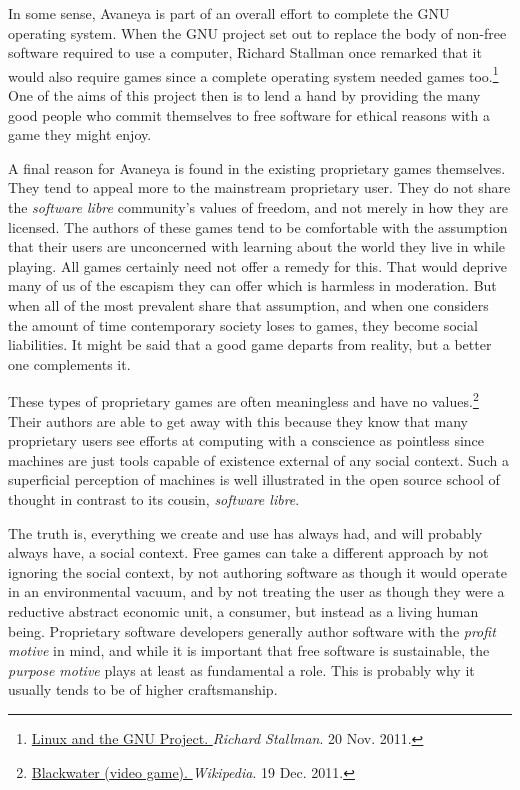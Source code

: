 In some sense, Avaneya is part of an overall effort to complete the GNU operating system. When the GNU project set out to replace the body of non-free software required to use a computer, Richard Stallman once remarked that it would also require games since a complete operating system needed games too.\footnote{\href{http://www.gnu.org/gnu/linux-and-gnu.html}{Linux and the GNU Project. }{\it Richard Stallman}. 20 Nov. 2011.} One of the aims of this project then is to lend a hand by providing the many good people who commit themselves to free software for ethical reasons with a game they might enjoy.

A final reason for Avaneya is found in the existing proprietary games themselves. They tend to appeal more to the mainstream proprietary user. They do not share the {\it software libre} community's values of freedom, and not merely in how they are licensed. The authors of these games tend to be comfortable with the assumption that their users are unconcerned with learning about the world they live in while playing. All games certainly need not offer a remedy for this. That would deprive many of us of the escapism they can offer which is harmless in moderation. But when all of the most prevalent share that assumption, and when one considers the amount of time contemporary society loses to games, they become social liabilities. It might be said that a good game departs from reality, but a better one complements it.

These types of proprietary games are often meaningless and have no values.\footnote{\href{https://secure.wikimedia.org/wikipedia/en/wiki/Blackwater_\%28video_game\%29}{Blackwater (video game). }{\it Wikipedia}. 19 Dec. 2011.} Their authors are able to get away with this because they know that many proprietary users see efforts at computing with a conscience as pointless since machines are just tools capable of existence external of any social context. Such a superficial perception of machines is well illustrated in the open source school of thought in contrast to its cousin, {\it software libre}. 

The truth is, everything we create and use has always had, and will probably always have, a social context. Free games can take a different approach by not ignoring the social context, by not authoring software as though it would operate in an environmental vacuum, and by not treating the user as though they were a reductive abstract economic unit, a consumer, but instead as a living human being. Proprietary software developers generally author software with the {\it profit motive} in mind, and while it is important that free software is sustainable, the {\it purpose motive} plays at least as fundamental a role. This is probably why it usually tends to be of higher craftsmanship.

